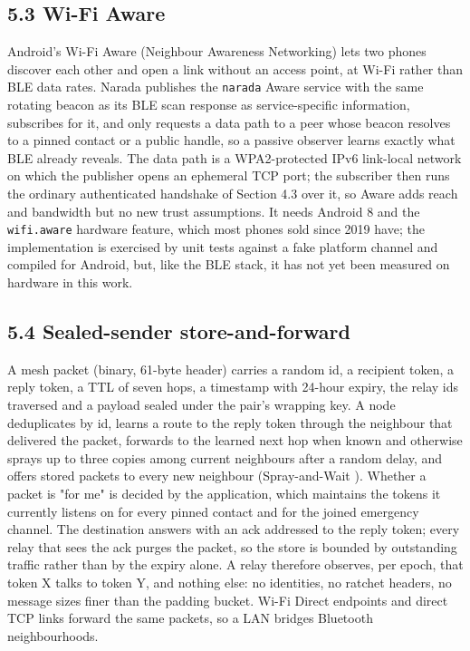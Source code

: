 \documentclass[conference]{IEEEtran}
\begin{document}
\subsection{5.3 Wi-Fi Aware}
Android's Wi-Fi Aware (Neighbour Awareness Networking) lets two phones discover each other and open a link without an access point, at Wi-Fi rather than BLE data rates. Narada publishes the \texttt{narada} Aware service with the same rotating beacon as its BLE scan response as service-specific information, subscribes for it, and only requests a data path to a peer whose beacon resolves to a pinned contact or a public handle, so a passive observer learns exactly what BLE already reveals. The data path is a WPA2-protected IPv6 link-local network on which the publisher opens an ephemeral TCP port; the subscriber then runs the ordinary authenticated handshake of Section 4.3 over it, so Aware adds reach and bandwidth but no new trust assumptions. It needs Android 8 and the \texttt{wifi.aware} hardware feature, which most phones sold since 2019 have; the implementation is exercised by unit tests against a fake platform channel and compiled for Android, but, like the BLE stack, it has not yet been measured on hardware in this work.

\subsection{5.4 Sealed-sender store-and-forward}
A mesh packet (binary, 61-byte header) carries a random id, a recipient token, a reply token, a TTL of seven hops, a timestamp with 24-hour expiry, the relay ids traversed and a payload sealed under the pair's wrapping key. A node deduplicates by id, learns a route to the reply token through the neighbour that delivered the packet, forwards to the learned next hop when known and otherwise sprays up to three copies among current neighbours after a random delay, and offers stored packets to every new neighbour (Spray-and-Wait \cite{ref8}). Whether a packet is "for me" is decided by the application, which maintains the tokens it currently listens on for every pinned contact and for the joined emergency channel. The destination answers with an ack addressed to the reply token; every relay that sees the ack purges the packet, so the store is bounded by outstanding traffic rather than by the expiry alone. A relay therefore observes, per epoch, that token X talks to token Y, and nothing else: no identities, no ratchet headers, no message sizes finer than the padding bucket. Wi-Fi Direct endpoints and direct TCP links forward the same packets, so a LAN bridges Bluetooth neighbourhoods.
\end{document}
